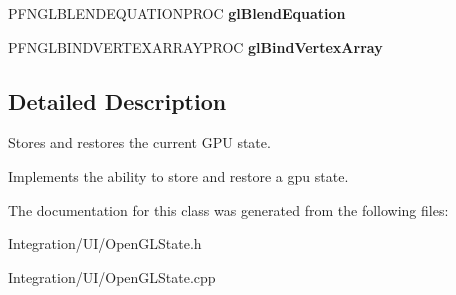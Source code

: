 \begin{DoxyCompactItemize}
\item 
\hypertarget{class_open_g_l_state_a0ecb2245f90bf326bf2c0d27b766f93a}{P\-F\-N\-G\-L\-B\-L\-E\-N\-D\-E\-Q\-U\-A\-T\-I\-O\-N\-P\-R\-O\-C {\bfseries gl\-Blend\-Equation}}\label{class_open_g_l_state_a0ecb2245f90bf326bf2c0d27b766f93a}

\item 
\hypertarget{class_open_g_l_state_ad5f735977961b5c835d1496978e58b04}{P\-F\-N\-G\-L\-B\-I\-N\-D\-V\-E\-R\-T\-E\-X\-A\-R\-R\-A\-Y\-P\-R\-O\-C {\bfseries gl\-Bind\-Vertex\-Array}}\label{class_open_g_l_state_ad5f735977961b5c835d1496978e58b04}

\end{DoxyCompactItemize}


\subsection{Detailed Description}
Stores and restores the current G\-P\-U state. 

Implements the ability to store and restore a gpu state. 

The documentation for this class was generated from the following files\-:\begin{DoxyCompactItemize}
\item 
Integration/\-U\-I/Open\-G\-L\-State.\-h\item 
Integration/\-U\-I/Open\-G\-L\-State.\-cpp\end{DoxyCompactItemize}
